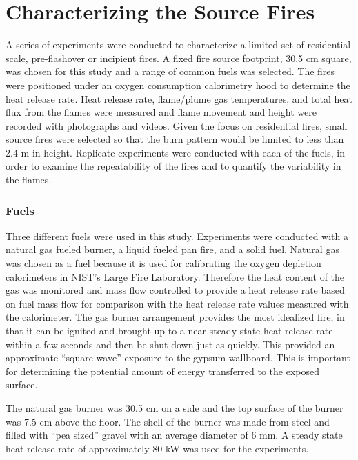 \documentclass[twoside]{uocthesis}
\begin{document}
\section{Characterizing the Source Fires}

A series of experiments were conducted to characterize a limited set of  residential scale, pre-flashover or incipient fires.  A fixed fire source footprint, 30.5 cm square, was chosen for this study and a range of common fuels was selected.  The fires were positioned under an oxygen consumption calorimetry hood to determine the heat release rate.  Heat release rate, flame/plume gas temperatures, and total heat flux from the flames were measured and flame movement and height were recorded with photographs and videos.  Given the focus on residential fires, small source fires were selected so that the burn pattern would be limited to less than 2.4 m in height.  Replicate experiments were conducted with each of the fuels, in order to examine the repeatability of the fires and to quantify the variability in the flames. 
 
\subsubsection{Fuels}

Three different fuels were used in this study.  Experiments were conducted with a natural gas fueled burner, a liquid fueled pan fire, and a solid fuel. Natural gas was chosen as a fuel because it is used for calibrating the oxygen depletion calorimeters in NIST’s Large Fire Laboratory.  Therefore the heat content of the gas was monitored and mass flow controlled to provide a heat release rate based on fuel mass flow for comparison with the heat release rate values measured with the calorimeter.  The gas burner arrangement provides the most idealized fire, in that it can be ignited and brought up to a near steady state heat release rate within a few seconds and then be shut down just as quickly.  This provided an approximate “square wave” exposure to the gypsum wallboard.  This is important for determining the potential amount of energy transferred to the exposed surface. 
 
The natural gas burner was 30.5 cm on a side and the top surface of the burner was 7.5 cm above the floor. The shell of the burner was made from steel and filled with “pea sized” gravel with an average diameter of 6 mm.  A steady state heat release rate of approximately 80 kW was used for the experiments.
\end{document}
